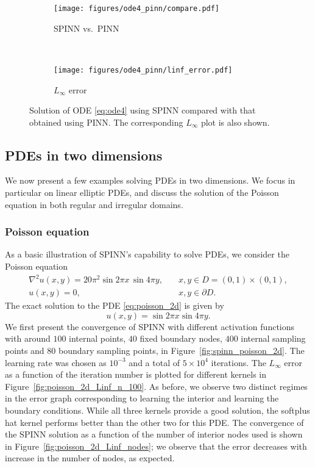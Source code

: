 \documentclass[12pt]{article}
\newcommand{\rb}[1]{#1}
\newcommand{\new}[1]{#1}
\begin{document}
\begin{figure}
\begin{subfigure}{0.5\textwidth}
\texttt{[image: figures/ode4\_pinn/compare.pdf]}
\caption{SPINN vs.\ PINN}
\label{ode4_pinn}
\end{subfigure}
~
\begin{subfigure}{0.5\textwidth}
\texttt{[image: figures/ode4\_pinn/linf\_error.pdf]}
\caption{$L_\infty$ error}
\label{ode4_pinn_Linf}
\end{subfigure}
\caption{Solution of ODE \eqref{eq:ode4} using SPINN compared with that obtained using PINN. The corresponding $L_\infty$ plot is also shown.}
\label{fig:spinn_ode4_pinn}
\end{figure}

\subsection{PDEs in two dimensions}
We now present a few examples solving PDEs \new{in two dimensions. We focus in particular on linear elliptic PDEs, and discuss the solution of the Poisson equation in both regular and irregular domains.}

\subsubsection{Poisson equation}
As a basic illustration of SPINN's capability to solve PDEs, we consider the Poisson equation
\begin{equation} \label{eq:poisson_2d}
\begin{split}
\nabla^2 u(x, y) = 20\pi^2 \sin 2\pi x \, \sin 4 \pi y, &\quad x,y \in D = (0,1)\times(0,1),\\
u(x,y) = 0, &\quad x, y \in \partial D.
\end{split}
\end{equation}
The exact solution to the PDE \eqref{eq:poisson_2d} is given by
\begin{equation} \label{eq:poisson_2d_exact}
u(x,y) = \sin 2\pi x \sin 4 \pi y.
\end{equation}
We first present the convergence of SPINN with different activation functions \rb{with around $100$ internal points, $40$ fixed boundary nodes, $400$ internal sampling points and $80$ boundary sampling points, in Figure~\ref{fig:spinn_poisson_2d}. The learning rate was chosen as $10^{-3}$ and a total of $5 \times 10^4$ iterations.} The $L_{\infty}$ error as a function of the iteration number is plotted for different kernels in Figure~\ref{fig:poisson_2d_Linf_n_100}. As before, we observe two distinct regimes in the error graph corresponding to learning the interior and learning the boundary conditions. While all three kernels provide a good solution, the softplus hat kernel performs better than the other two for this PDE. The convergence of the SPINN solution as a function of the number of interior nodes used is shown in Figure~\ref{fig:poisson_2d_Linf_nodes}; we observe that the error decreases with increase in the number of nodes, as expected.
\end{document}
